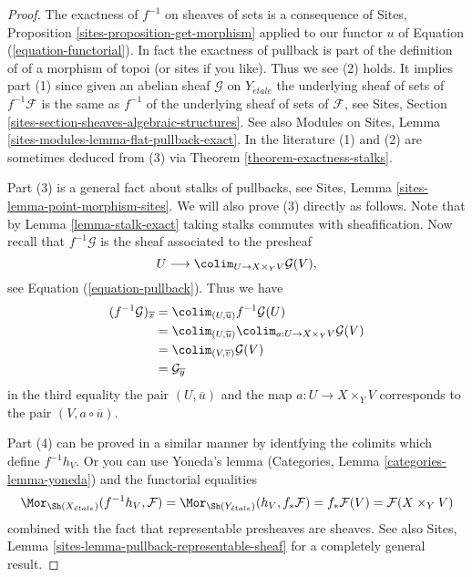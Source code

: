 \begin{proof}
The exactness of $f^{-1}$ on sheaves of sets is a consequence of
Sites, Proposition \ref{sites-proposition-get-morphism}
applied to our functor $u$ of Equation (\ref{equation-functorial}).
In fact the exactness of pullback is part of the definition of
of a morphism of topoi (or sites if you like). Thus we see (2) holds.
It implies part (1) since given an abelian sheaf $\mathcal{G}$ on
$Y_{\acute{e}tale}$
the underlying sheaf of sets of $f^{-1}\mathcal{F}$ is the same
as $f^{-1}$ of the underlying sheaf of sets of $\mathcal{F}$, see
Sites, Section \ref{sites-section-sheaves-algebraic-structures}.
See also
Modules on Sites, Lemma \ref{sites-modules-lemma-flat-pullback-exact}.
In the literature (1) and (2) are sometimes deduced from (3) via
Theorem \ref{theorem-exactness-stalks}.

\medskip\noindent
Part (3) is a general fact about stalks of pullbacks, see
Sites, Lemma \ref{sites-lemma-point-morphism-sites}.
We will also prove (3) directly as follows. Note that by
Lemma \ref{lemma-stalk-exact}
taking stalks commutes with sheafification.
Now recall that $f^{-1}\mathcal{G}$ is the sheaf
associated to the presheaf
$$
U \longrightarrow \colim_{U \to X \times_Y V} \mathcal{G}(V),
$$
see Equation (\ref{equation-pullback}).
Thus we have
\begin{align*}
(f^{-1}\mathcal{G})_{\overline{x}}
& = \colim_{(U, \overline{u})} f^{-1}\mathcal{G}(U) \\
& = \colim_{(U, \overline{u})}
\colim_{a : U \to X \times_Y V} \mathcal{G}(V) \\
& = \colim_{(V, \overline{v})} \mathcal{G}(V) \\
& = \mathcal{G}_{\overline{y}}
\end{align*}
in the third equality the pair $(U, \overline{u})$ and the map
$a : U \to X \times_Y V$ corresponds to the pair $(V, a \circ \overline{u})$.

\medskip\noindent
Part (4) can be proved in a similar manner by identfying the colimits
which define $f^{-1}h_V$. Or you can use
Yoneda's lemma (Categories, Lemma \ref{categories-lemma-yoneda})
and the functorial equalities
$$
\Mor_{\Sh(X_{\acute{e}tale})}(f^{-1}h_V, \mathcal{F}) =
\Mor_{\Sh(Y_{\acute{e}tale})}(h_V, f_*\mathcal{F}) =
f_*\mathcal{F}(V) = \mathcal{F}(X \times_Y V)
$$
combined with the fact that representable presheaves are sheaves. See also
Sites, Lemma \ref{sites-lemma-pullback-representable-sheaf}
for a completely general result.
\end{proof}

